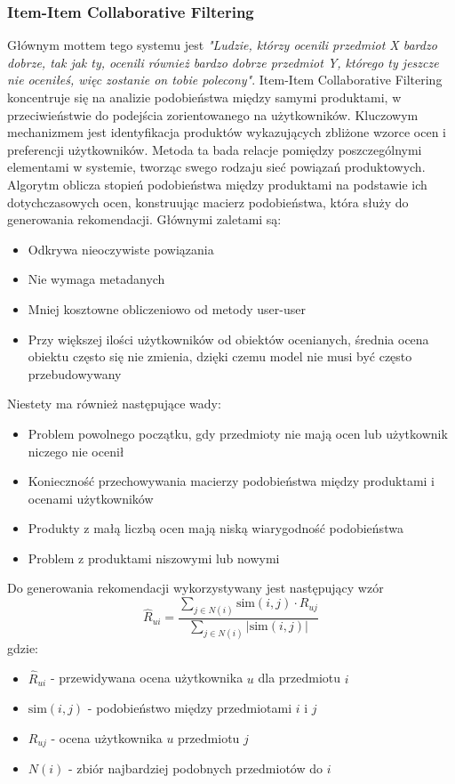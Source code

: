 \documentclass{article}
\begin{document}
\subsubsection{Item-Item Collaborative Filtering}
Głównym mottem tego systemu jest \textit{"Ludzie, którzy ocenili przedmiot X bardzo dobrze, tak jak ty, ocenili również bardzo dobrze przedmiot Y, którego ty jeszcze nie oceniłeś, więc zostanie on tobie polecony"}. Item-Item Collaborative Filtering koncentruje się na analizie podobieństwa między samymi produktami, w przeciwieństwie do podejścia zorientowanego na użytkowników. Kluczowym mechanizmem jest identyfikacja produktów wykazujących zbliżone wzorce ocen i preferencji użytkowników.
Metoda ta bada relacje pomiędzy poszczególnymi elementami w systemie, tworząc swego rodzaju sieć powiązań produktowych. Algorytm oblicza stopień podobieństwa między produktami na podstawie ich dotychczasowych ocen, konstruując macierz podobieństwa, która służy do generowania rekomendacji. Głównymi zaletami są:
\begin{itemize}
    \item Odkrywa nieoczywiste powiązania
    \item Nie wymaga metadanych
    \item Mniej kosztowne obliczeniowo od metody user-user
    \item Przy większej ilości użytkowników od obiektów ocenianych, średnia ocena obiektu często się nie zmienia, dzięki czemu model nie musi być często przebudowywany
\end{itemize}
Niestety ma również następujące wady:
\begin{itemize}
    \item Problem powolnego początku, gdy przedmioty nie mają ocen lub użytkownik niczego nie ocenił
    \item Konieczność przechowywania macierzy podobieństwa między produktami i ocenami użytkowników
    \item Produkty z małą liczbą ocen mają niską wiarygodność podobieństwa
    \item Problem z produktami niszowymi lub nowymi
\end{itemize}
Do generowania rekomendacji wykorzystywany jest następujący wzór
\begin{equation}
    \hat{R}_{ui} = \frac{\sum_{j \in N(i)} \text{sim}(i,j) \cdot R_{uj}}{\sum_{j \in N(i)} |\text{sim}(i,j)|}
\end{equation}
gdzie:
\begin{itemize}
    \item $\hat{R}_{ui}$ - przewidywana ocena użytkownika $u$ dla przedmiotu $i$
    \item $\text{sim}(i,j)$ - podobieństwo między przedmiotami $i$ i $j$
    \item $R_{uj}$ - ocena użytkownika $u$ przedmiotu $j$
    \item $N(i)$ - zbiór najbardziej podobnych przedmiotów do $i$
\end{itemize}
\end{document}
